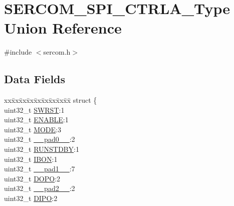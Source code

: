 \hypertarget{union_s_e_r_c_o_m___s_p_i___c_t_r_l_a___type}{}\section{S\+E\+R\+C\+O\+M\+\_\+\+S\+P\+I\+\_\+\+C\+T\+R\+L\+A\+\_\+\+Type Union Reference}
\label{union_s_e_r_c_o_m___s_p_i___c_t_r_l_a___type}


{\ttfamily \#include $<$sercom.\+h$>$}

\subsection*{Data Fields}
\begin{DoxyCompactItemize}
\item 
\begin{tabbing}
xx\=xx\=xx\=xx\=xx\=xx\=xx\=xx\=xx\=\kill
struct \{\\
\>uint32\_t \mbox{\hyperlink{union_s_e_r_c_o_m___s_p_i___c_t_r_l_a___type_a34cd956a8da179cbd5fc9060306d420e}{SWRST}}:1\\
\>uint32\_t \mbox{\hyperlink{union_s_e_r_c_o_m___s_p_i___c_t_r_l_a___type_a66f979832c85e0692bd9422b05aff1f7}{ENABLE}}:1\\
\>uint32\_t \mbox{\hyperlink{union_s_e_r_c_o_m___s_p_i___c_t_r_l_a___type_aad9612db6a93afb1482213d2d36f1c5e}{MODE}}:3\\
\>uint32\_t \mbox{\hyperlink{union_s_e_r_c_o_m___s_p_i___c_t_r_l_a___type_a3e57c2ef1c3ffb36722f000cc1156824}{\_\_pad0\_\_}}:2\\
\>uint32\_t \mbox{\hyperlink{union_s_e_r_c_o_m___s_p_i___c_t_r_l_a___type_a5656560aef3eaf5aac89b68b9fe39c3a}{RUNSTDBY}}:1\\
\>uint32\_t \mbox{\hyperlink{union_s_e_r_c_o_m___s_p_i___c_t_r_l_a___type_aa72c38a0b61edb45766092a3f25ffe9b}{IBON}}:1\\
\>uint32\_t \mbox{\hyperlink{union_s_e_r_c_o_m___s_p_i___c_t_r_l_a___type_a6712ba6dd1d5b43d2d56ff8ac4e275a7}{\_\_pad1\_\_}}:7\\
\>uint32\_t \mbox{\hyperlink{union_s_e_r_c_o_m___s_p_i___c_t_r_l_a___type_af541f6eba161627b0e7f99317cc4ad71}{DOPO}}:2\\
\>uint32\_t \mbox{\hyperlink{union_s_e_r_c_o_m___s_p_i___c_t_r_l_a___type_a9ce12a63de64ef64ae2d59d128251cae}{\_\_pad2\_\_}}:2\\
\>uint32\_t \mbox{\hyperlink{union_s_e_r_c_o_m___s_p_i___c_t_r_l_a___type_a6090371d24ac6f2a9aab623bda7dceb3}{DIPO}}:2\\

\end{tabbing}
\end{DoxyCompactItemize}

